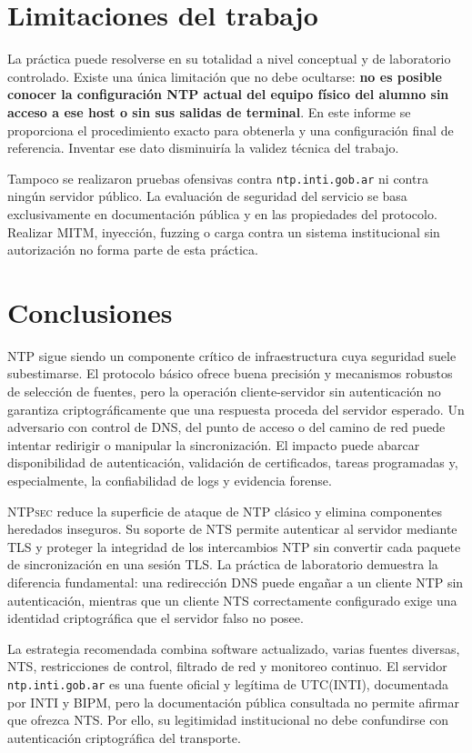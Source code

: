 \documentclass[11pt,a4paper]{article}
\newcommand{\ntpsec}{\textsc{NTPsec}}
\newcommand{\nts}{\textsc{NTS}}
\begin{document}
\section{Limitaciones del trabajo}

La práctica puede resolverse en su totalidad a nivel conceptual y de laboratorio controlado. Existe una única limitación que no debe ocultarse: \textbf{no es posible conocer la configuración NTP actual del equipo físico del alumno sin acceso a ese host o sin sus salidas de terminal}. En este informe se proporciona el procedimiento exacto para obtenerla y una configuración final de referencia. Inventar ese dato disminuiría la validez técnica del trabajo.

Tampoco se realizaron pruebas ofensivas contra \texttt{ntp.inti.gob.ar} ni contra ningún servidor público. La evaluación de seguridad del servicio se basa exclusivamente en documentación pública y en las propiedades del protocolo. Realizar MITM, inyección, fuzzing o carga contra un sistema institucional sin autorización no forma parte de esta práctica.

\section{Conclusiones}

NTP sigue siendo un componente crítico de infraestructura cuya seguridad suele subestimarse. El protocolo básico ofrece buena precisión y mecanismos robustos de selección de fuentes, pero la operación cliente-servidor sin autenticación no garantiza criptográficamente que una respuesta proceda del servidor esperado. Un adversario con control de DNS, del punto de acceso o del camino de red puede intentar redirigir o manipular la sincronización. El impacto puede abarcar disponibilidad de autenticación, validación de certificados, tareas programadas y, especialmente, la confiabilidad de logs y evidencia forense.

\ntpsec{} reduce la superficie de ataque de NTP clásico y elimina componentes heredados inseguros. Su soporte de \nts{} permite autenticar al servidor mediante TLS y proteger la integridad de los intercambios NTP sin convertir cada paquete de sincronización en una sesión TLS. La práctica de laboratorio demuestra la diferencia fundamental: una redirección DNS puede engañar a un cliente NTP sin autenticación, mientras que un cliente NTS correctamente configurado exige una identidad criptográfica que el servidor falso no posee.

La estrategia recomendada combina software actualizado, varias fuentes diversas, NTS, restricciones de control, filtrado de red y monitoreo continuo. El servidor \texttt{ntp.inti.gob.ar} es una fuente oficial y legítima de UTC(INTI), documentada por INTI y BIPM, pero la documentación pública consultada no permite afirmar que ofrezca NTS. Por ello, su legitimidad institucional no debe confundirse con autenticación criptográfica del transporte.
\end{document}
